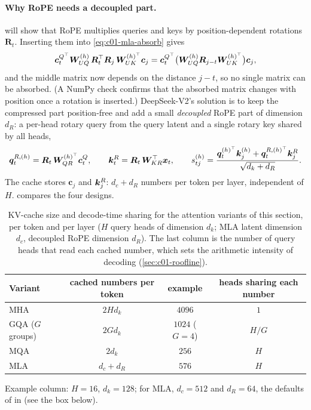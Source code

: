 \paragraph{Why RoPE needs a decoupled part.}  will show that RoPE
multiplies queries and keys by position-dependent rotations $\bm{R}_t$. Inserting them into
\eqref{eq:c01-mla-absorb} gives
\[
  \bm{c}^{Q^{\top}}_t\bm{W}_{UQ}^{(h)}\,\bm{R}_t^{\top}\bm{R}_j\,\bm{W}_{UK}^{(h)^{\top}}\bm{c}_j
  = \bm{c}^{Q^{\top}}_t\bigl(\bm{W}_{UQ}^{(h)}\bm{R}_{j-t}\bm{W}_{UK}^{(h)^{\top}}\bigr)\bm{c}_j ,
\]
and the middle matrix now depends on the distance $j - t$, so no single matrix can be
absorbed. (A NumPy check confirms that the absorbed
matrix changes with position once a rotation is inserted.) DeepSeek-V2's solution is to
keep the compressed part position-free and add a small \emph{decoupled} RoPE part of
dimension $d_R$: a per-head rotary query from the query latent and a single rotary key
shared by all heads,
\begin{equation}\label{eq:c01-mla-rope}
  \bm{q}_t^{R,(h)} = \bm{R}_t\,\bm{W}_{QR}^{(h)^{\top}}\bm{c}^Q_t,\qquad
  \bm{k}_t^{R} = \bm{R}_t\,\bm{W}_{KR}^{\top}\bm{x}_t,\qquad
  s^{(h)}_{tj} = \frac{\bm{q}_t^{(h)^{\top}}\bm{k}_j^{(h)} + \bm{q}_t^{R,(h)^{\top}}\bm{k}_j^{R}}{\sqrt{d_k + d_R}} .
\end{equation}
The cache stores $\bm{c}_j$ and $\bm{k}_j^{R}$: $d_c + d_R$ numbers per token per layer,
independent of $H$.  compares the four designs.

\begin{table}[t]
\centering
\caption{KV-cache size and decode-time sharing for the attention variants of this section,
per token and per layer ($H$ query heads of dimension $d_k$; MLA latent dimension $d_c$,
decoupled RoPE dimension $d_R$). The last column is the number of query heads that read
each cached number, which sets the arithmetic intensity of decoding
(\cref{sec:c01-roofline}).}
\label{tab:c01-attn-variants}
\begin{tabular}{@{}lccc@{}}
\toprule
Variant & cached numbers per token & example & heads sharing each number\\
\midrule
MHA & $2Hd_k$ & $4096$ & $1$\\
GQA ($G$ groups) & $2Gd_k$ & $1024$ ($G = 4$) & $H/G$\\
MQA & $2d_k$ & $256$ & $H$\\
MLA & $d_c + d_R$ & $576$ & $H$\\
\bottomrule
\end{tabular}

\smallskip
{\small Example column: $H = 16$, $d_k = 128$; for MLA, $d_c = 512$ and $d_R = 64$, the
defaults of  in \fla{} (see the box below).}
\end{table}

